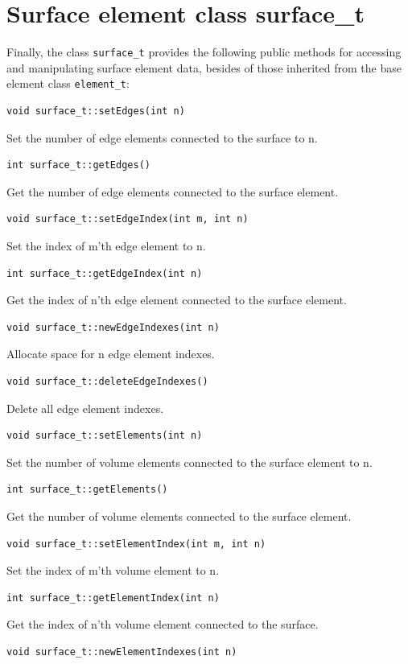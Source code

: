 \section{Surface element class surface\_t}

Finally, the class {\tt surface\_t} provides the following public methods for
accessing and manipulating surface element data, besides of those inherited
from the base element class {\tt element\_t}:

\begin{verbatim}
void surface_t::setEdges(int n)
\end{verbatim}
Set the number of edge elements connected to the surface to n.
\begin{verbatim}
int surface_t::getEdges()
\end{verbatim}
Get the number of edge elements connected to the surface element.
\begin{verbatim}
void surface_t::setEdgeIndex(int m, int n)
\end{verbatim}
Set the index of m'th edge element to n.
\begin{verbatim}
int surface_t::getEdgeIndex(int n)
\end{verbatim}
Get the index of n'th edge element connected to the surface element.
\begin{verbatim}
void surface_t::newEdgeIndexes(int n)
\end{verbatim}
Allocate space for n edge element indexes.
\begin{verbatim}
void surface_t::deleteEdgeIndexes()
\end{verbatim}
Delete all edge element indexes.
\begin{verbatim}
void surface_t::setElements(int n)
\end{verbatim}
Set the number of volume elements connected to the surface element to n.
\begin{verbatim}
int surface_t::getElements()
\end{verbatim}
Get the number of volume elements connected to the surface element.
\begin{verbatim}
void surface_t::setElementIndex(int m, int n)
\end{verbatim}
Set the index of m'th volume element to n.
\begin{verbatim}
int surface_t::getElementIndex(int n)
\end{verbatim}
Get the index of n'th volume element connected to the surface.
\begin{verbatim}
void surface_t::newElementIndexes(int n)
\end{verbatim}

